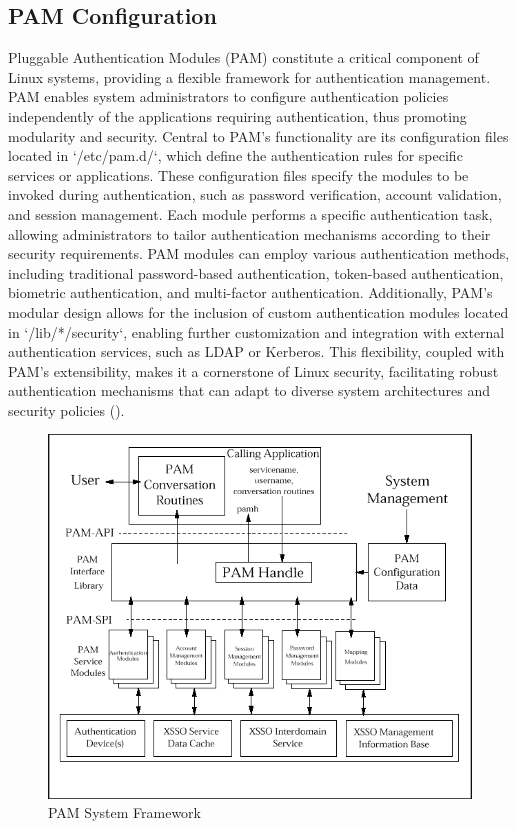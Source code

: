 \documentclass[
]{article}
\begin{document}
\begin{multicols}{2}

\section{PAM Configuration}
Pluggable Authentication Modules (PAM) constitute a critical component of Linux systems, providing a flexible framework for authentication management. PAM enables system administrators to configure authentication policies independently of the applications requiring authentication, thus promoting modularity and security. Central to PAM's functionality are its configuration files located in `/etc/pam.d/`, which define the authentication rules for specific services or applications. These configuration files specify the modules to be invoked during authentication, such as password verification, account validation, and session management. Each module performs a specific authentication task, allowing administrators to tailor authentication mechanisms according to their security requirements. PAM modules can employ various authentication methods, including traditional password-based authentication, token-based authentication, biometric authentication, and multi-factor authentication. Additionally, PAM's modular design allows for the inclusion of custom authentication modules located in `/lib/*/security`, enabling further customization and integration with external authentication services, such as LDAP or Kerberos. This flexibility, coupled with PAM's extensibility, makes it a cornerstone of Linux security, facilitating robust authentication mechanisms that can adapt to diverse system architectures and security policies (\cite{jones2022importance}). 

\end{multicols}

\begin{figure}[htbp]
  \centering
  \includegraphics[width=0.4\linewidth]{images/pam_configuration.png}
  \caption{PAM System Framework}
\end{figure}
\end{document}
